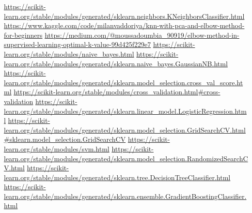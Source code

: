 \begin{thebibliography}{9}
\url{https://scikit-learn.org/stable/modules/generated/sklearn.neighbors.KNeighborsClassifier.html}
\url{https://www.kaggle.com/code/milanvaddoriya/knn-with-pca-and-elbow-method-for-beginners}
\url{https://medium.com/@moussadoumbia_90919/elbow-method-in-supervised-learning-optimal-k-value-99d425f229e7}
\url{https://scikit-learn.org/stable/modules/naive_bayes.html}
\url{https://scikit-learn.org/stable/modules/generated/sklearn.naive_bayes.GaussianNB.html}
\url{https://scikit-learn.org/stable/modules/generated/sklearn.model_selection.cross_val_score.html}
\url{https://scikit-learn.org/stable/modules/cross_validation.html#cross-validation}
\url{https://scikit-learn.org/stable/modules/generated/sklearn.linear_model.LogisticRegression.html}
\url{https://scikit-learn.org/stable/modules/generated/sklearn.model_selection.GridSearchCV.html#sklearn.model_selection.GridSearchCV}
\url{https://scikit-learn.org/stable/modules/svm.html}
\url{https://scikit-learn.org/stable/modules/generated/sklearn.model_selection.RandomizedSearchCV.html}
\url{https://scikit-learn.org/stable/modules/generated/sklearn.tree.DecisionTreeClassifier.html}
\url{https://scikit-learn.org/stable/modules/generated/sklearn.ensemble.GradientBoostingClassifier.html}







\end{thebibliography}